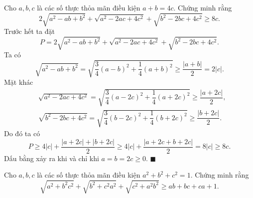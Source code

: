 \begin{bt} %
	Cho $a,b,c$ là các số thực thỏa mãn điều kiện $a+b=4c.$ Chứng minh rằng $$2\sqrt{a^2-ab+b^2}+\sqrt{a^2-2ac+4c^2}+\sqrt{b^2-2bc+4c^2}\ge 8c.$$
	\loigiai
	{
		Trước hết ta đặt $$P=2\sqrt{a^2-ab+b^2}+\sqrt{a^2-2ac+4c^2}+\sqrt{b^2-2bc+4c^2}.$$
		Ta có $$\sqrt{a^2-ab+b^2}=\sqrt{\dfrac{3}{4}(a-b)^2+\dfrac{1}{4}(a+b)^2}\ge \dfrac{|a+b|}{2}=2|c|.$$
		Mặt khác $$\begin{aligned}
		&\sqrt{a^2-2ac+4c^2}=\sqrt{\dfrac{3}{4}(a-2c)^2+\dfrac{1}{4}(a+2c)^2}\ge \dfrac{|a+2c|}{2},\\ 
		&\sqrt{b^2-2bc+4c^2}=\sqrt{\dfrac{3}{4}(b-2c)^2+\dfrac{1}{4}(b+2c)^2}\ge \dfrac{|b+2c|}{2}.
		\end{aligned}$$
		Do đó ta có $$
		P\ge 4|c|+\dfrac{|a+2c|+|b+2c|}{2}\ge 4|c|+\dfrac{|a+2c+b+2c|}{2}=8|c|\ge 8c.$$
		Dấu bằng xảy ra khi và chỉ khi $a=b=2c\ge 0.$
		$\blacksquare$
	}
\end{bt}

\begin{bt}%
	Cho $a,b,c$ là các số thực thỏa mãn điều kiện $a^2+b^2+c^2=1.$ Chứng minh rằng $$\sqrt{a^2+b^2c^2}+\sqrt{b^2+c^2a^2}+\sqrt{c^2+a^2b^2}\ge ab+bc+ca+1.$$
\end{bt}

